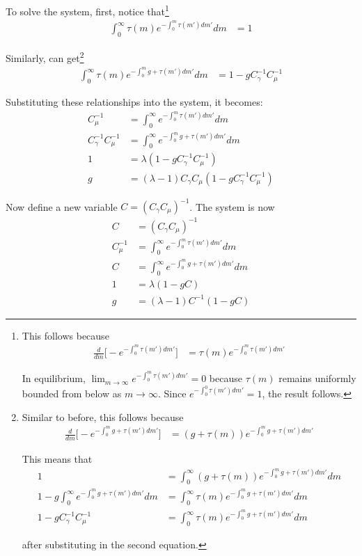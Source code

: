 \documentclass[12pt,english]{article}
\theoremstyle{remark}
\begin{document}
To solve the system, first, notice that\footnote{This follows because 
	\begin{align*}
	\frac{d}{dm} \big[ -e^{-\int_0^m \tau(m')dm'} \big] &= \tau(m)e^{-\int_0^m \tau(m')dm'}
	\end{align*}
	
	In equilibrium, $\lim_{m \to \infty} e^{-\int_0^m \tau(m')dm'} = 0$ because $\tau(m)$ remains uniformly bounded from below as $m \to \infty$. Since $e^{-\int_0^0 \tau(m')dm'} = 1$, the result follows.}
\begin{align*}
	\int_{0}^{\infty} \tau(m) e^{-\int_0^m \tau(m')dm'} dm &= 1 
\end{align*}

Similarly, can get\footnote{Similar to before, this follows because
	\begin{align*}
	\frac{d}{dm} \big[ -e^{-\int_0^m g + \tau(m')dm'} \big] &= (g +\tau(m))e^{-\int_0^m g + \tau(m')dm'}
	\end{align*}
	
	This means that 
	\begin{align*}
	1 &= \int_0^{\infty} (g + \tau(m)) e^{-\int_0^m g+ \tau(m')dm'} dm \\
	1 - g\int_0^{\infty} e^{-\int_0^m g + \tau(m') dm'} dm &= \int_0^{\infty} \tau(m) e^{-\int_0^m g+ \tau(m')dm'} dm \\ 
	1 - g C_{\gamma}^{-1} C_{\mu}^{-1} &= \int_0^{\infty} \tau(m) e^{-\int_0^m g+ \tau(m')dm'} dm
	\end{align*}
	
	after substituting in the second equation.}
\begin{align*}
	\int_0^{\infty} \tau(m)e^{-\int_0^m g + \tau(m')dm'} dm &= 1 - g C_{\gamma}^{-1} C_{\mu}^{-1}
\end{align*}

Substituting these relationships into the system, it becomes:
\begin{align*}
	C_{\mu}^{-1} &= \int_0^{\infty} e^{-\int_0^m \tau(m')dm'}dm \\
	C_{\gamma}^{-1} C_{\mu}^{-1} &= \int_0^{\infty} e^{-\int_0^m g + \tau(m') dm'} dm \\
	1 &= \lambda (1 - gC_{\gamma}^{-1} C_{\mu}^{-1}) \\ 
	g &= (\lambda -1) C_{\gamma}C_{\mu} (1 - gC_{\gamma}^{-1} C_{\mu}^{-1}) 
\end{align*}

Now define a new variable $C = (C_{\gamma}C_{\mu})^{-1}$. The system is now
\begin{align*}
	C &= (C_{\gamma}C_{\mu})^{-1} \\
	C_{\mu}^{-1} &= \int_0^{\infty} e^{-\int_0^m \tau(m')dm'} dm \\
	C &= \int_0^{\infty} e^{-\int_0^m g + \tau(m') dm'} dm \\
	1 &= \lambda (1 - gC) \\
	g &= (\lambda -1) C^{-1}(1 - gC)
\end{align*}
\end{document}
